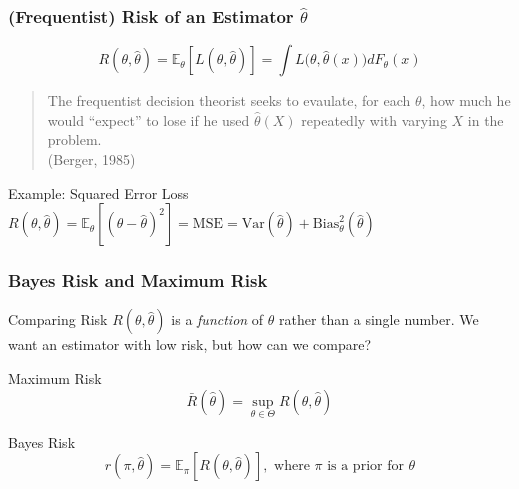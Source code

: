\begin{frame}
  \frametitle{(Frequentist) Risk of an Estimator $\widehat{\theta}$}

  \[
    \boxed{
      R(\theta, \widehat{\theta}) = \mathbb{E}_\theta \left[ L(\theta, \widehat{\theta}) \right] = \int L\big(\theta, \widehat{\theta}(x)\big) dF_\theta(x)}
  \]
  
  \vspace{1em}

  \begin{quote}
    The frequentist decision theorist seeks to evaulate, for each $\theta$, how much he would ``expect'' to lose if he used $\widehat{\theta}(X)$ repeatedly with varying $X$ in the problem.\\ \hfill (Berger, 1985)
  \end{quote}


  \begin{block}{Example: Squared Error Loss}
    $R(\theta, \widehat{\theta}) = \mathbb{E}_\theta\left[ (\theta - \widehat{\theta})^2 \right] = \mbox{MSE} = \mbox{Var}(\widehat{\theta}) + \mbox{Bias}_\theta^2(\widehat{\theta})$
  \end{block}

\end{frame}
\begin{frame}
  \frametitle{Bayes Risk and Maximum Risk}

  \begin{block}{Comparing Risk}
    $R(\theta, \widehat{\theta})$ is a \emph{function} of $\theta$ rather than a single number.
    We want an estimator with low risk, but how can we compare?
  \end{block}

  \vspace{1em}

  \begin{block}{Maximum Risk}
    \vspace{-1em}
    \[\boxed{\bar{R}(\widehat{\theta}) = \sup_{\theta \in \Theta} R(\theta, \widehat{\theta})}\] 
  \end{block}

  \vspace{-2em}

  \begin{block}{Bayes Risk}
    \vspace{-1em}
    \[\boxed{r(\pi, \widehat{\theta}) = \mathbb{E}_\pi \left[ R(\theta, \widehat{\theta}) \right], \mbox{ where } \pi \mbox{ is a prior for } \theta}\]
  \end{block}

\end{frame}
